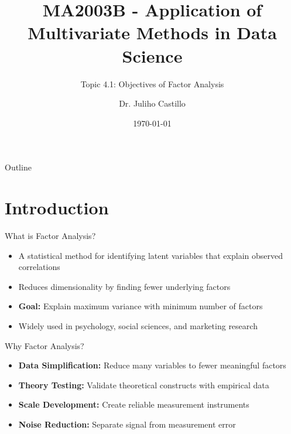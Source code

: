 \documentclass[aspectratio=169]{beamer}
\title[Objectives of Factor Analysis]{MA2003B - Application of Multivariate Methods in Data Science}
\subtitle{Topic 4.1: Objectives of Factor Analysis}
\author{Dr. Juliho Castillo}
\institute{Tec de Monterrey}
\date{\today}
\begin{document}
\begin{frame}
  \titlepage
\end{frame}

\begin{frame}{Outline}
  \tableofcontents
\end{frame}

\section{Introduction}
\begin{frame}
  \sectionpage
\end{frame}
\begin{frame}{What is Factor Analysis?}
  \begin{itemize}
    \item A statistical method for identifying latent variables that explain observed correlations
    \item Reduces dimensionality by finding fewer underlying factors
    \item \textbf{Goal:} Explain maximum variance with minimum number of factors
    \item Widely used in psychology, social sciences, and marketing research
  \end{itemize}
\end{frame}

\begin{frame}{Why Factor Analysis?}
  \begin{itemize}
    \item \textbf{Data Simplification:} Reduce many variables to fewer meaningful factors
    \item \textbf{Theory Testing:} Validate theoretical constructs with empirical data
    \item \textbf{Scale Development:} Create reliable measurement instruments
    \item \textbf{Noise Reduction:} Separate signal from measurement error
  \end{itemize}
\end{frame}
\end{document}
